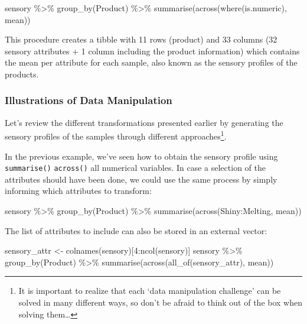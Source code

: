 \documentclass[
]{book}
\newenvironment{Shaded}{\begin{snugshade}}{\end{snugshade}}
\newcommand{\DecValTok}[1]{\textcolor[rgb]{0.00,0.00,0.81}{#1}}
\newcommand{\FunctionTok}[1]{\textcolor[rgb]{0.00,0.00,0.00}{#1}}
\newcommand{\NormalTok}[1]{#1}
\newcommand{\OtherTok}[1]{\textcolor[rgb]{0.56,0.35,0.01}{#1}}
\newcommand{\SpecialCharTok}[1]{\textcolor[rgb]{0.00,0.00,0.00}{#1}}
\begin{document}
\begin{Shaded}
\begin{Highlighting}[]
\NormalTok{sensory }\SpecialCharTok{\%\textgreater{}\%} 
  \FunctionTok{group\_by}\NormalTok{(Product) }\SpecialCharTok{\%\textgreater{}\%} 
  \FunctionTok{summarise}\NormalTok{(}\FunctionTok{across}\NormalTok{(}\FunctionTok{where}\NormalTok{(is.numeric), mean))}
\end{Highlighting}
\end{Shaded}

This procedure creates a tibble with 11 rows (product) and 33 columns (32 sensory attributes + 1 column including the product information) which contains the mean per attribute for each sample, also known as the sensory profiles of the products.

\hypertarget{illustrations-of-data-manipulation}{%
\subsubsection{Illustrations of Data Manipulation}\label{illustrations-of-data-manipulation}}

Let's review the different transformations presented earlier by generating the sensory profiles of the samples through different approaches\footnote{It is important to realize that each `data manipulation challenge' can be solved in many different ways, so don't be afraid to think out of the box when solving them\ldots{}}.

In the previous example, we've seen how to obtain the sensory profile using \texttt{summarise()} \texttt{across()} all numerical variables. In case a selection of the attributes should have been done, we could use the same process by simply informing which attributes to transform:

\begin{Shaded}
\begin{Highlighting}[]
\NormalTok{sensory }\SpecialCharTok{\%\textgreater{}\%} 
  \FunctionTok{group\_by}\NormalTok{(Product) }\SpecialCharTok{\%\textgreater{}\%} 
  \FunctionTok{summarise}\NormalTok{(}\FunctionTok{across}\NormalTok{(Shiny}\SpecialCharTok{:}\NormalTok{Melting, mean))}
\end{Highlighting}
\end{Shaded}

The list of attributes to include can also be stored in an external vector:

\begin{Shaded}
\begin{Highlighting}[]
\NormalTok{sensory\_attr }\OtherTok{\textless{}{-}} \FunctionTok{colnames}\NormalTok{(sensory)[}\DecValTok{4}\SpecialCharTok{:}\FunctionTok{ncol}\NormalTok{(sensory)]}
\NormalTok{sensory }\SpecialCharTok{\%\textgreater{}\%} 
  \FunctionTok{group\_by}\NormalTok{(Product) }\SpecialCharTok{\%\textgreater{}\%} 
  \FunctionTok{summarise}\NormalTok{(}\FunctionTok{across}\NormalTok{(}\FunctionTok{all\_of}\NormalTok{(sensory\_attr), mean))}
\end{Highlighting}
\end{Shaded}
\end{document}
